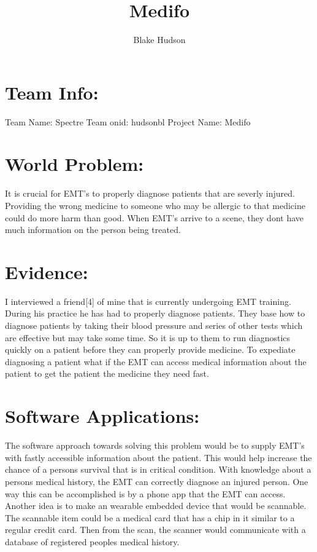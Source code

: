 \documentclass[12pt]{article}
\title{Medifo}
\author{Blake Hudson}
\begin{document}
\maketitle

\section{Team Info:}
Team Name:    Spectre\newline
Team onid:    hudsonbl\newline
Project Name: Medifo
\section{World Problem:}
It is crucial for EMT's to properly diagnose patients that are severly injured. Providing the wrong medicine to someone who may be allergic to that medicine could do more harm than good. When EMT's arrive to a scene, they dont have much information on the person being treated.

\section{Evidence:}
I interviewed a friend[4] of mine that is currently undergoing EMT training. During his practice he has had to properly diagnose patients. They base how to diagnose patients by taking their blood pressure and series of other tests which are effective but may take some time. So it is up to them to run diagnostics quickly on a patient before they can properly provide medicine. To expediate diagnosing a patient what if the EMT can access medical information about the patient to get the patient the medicine they need fast.

\section{Software Applications:}
The software approach towards solving this problem would be to supply EMT's with fastly accessible information about the patient. This would help increase the chance of a persons survival that is in critical condition. With knowledge about a persons medical history, the EMT can correctly diagnose an injured person. One way this can be accomplished is by a phone app that the EMT can access. Another idea is to make an wearable embedded device that would be scannable. The scannable item could be a medical card that has a chip in it similar to a regular credit card. Then from the scan, the scanner would communicate with a database of registered peoples medical history. 
\end{document}
